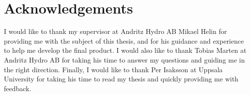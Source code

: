 
\chapter{Acknowledgements} %
\label{cha:acknowledgement}

I would like to thank my supervisor at Andritz Hydro AB Mikael Helin for providing me with the subject of this thesis, and for his guidance and experience to help me develop the final product. I would also like to thank Tobias Marten at Andritz Hydro AB for taking his time to answer my questions and guiding me in the right direction. Finally, I would like to thank Per Isaksson at Uppsala University for taking his time to read my thesis and quickly providing me with feedback.

